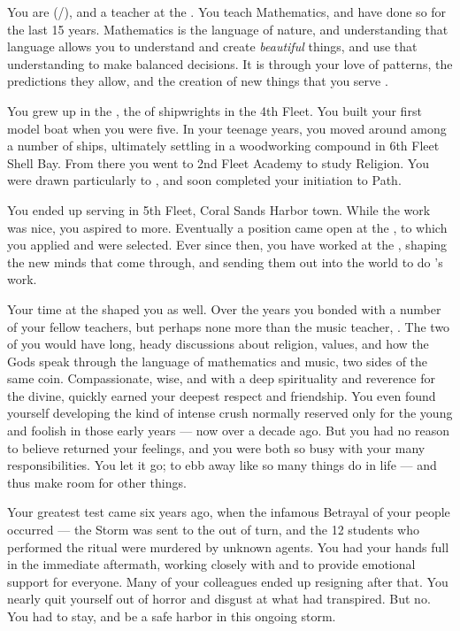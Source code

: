 \documentclass[char]{GL2020}
\begin{document}
\name{\cFlowPriest{}}

You are \cFlowPriest{\full} (\cFlowPriest{\they}/\cFlowPriest{\them}), and a teacher at the \pSchool{}. You teach Mathematics, and have done so for the last 15 years. Mathematics is the language of nature, and understanding that language allows you to understand and create \emph{beautiful} things, and use that understanding to make balanced decisions. It is through your love of patterns, the predictions they allow, and the creation of new things that you serve \cFlow{\full}.

You grew up in the \pShip{}, the \cFlowPriest{\offspring} of shipwrights in the 4th Fleet. You built your first model boat when you were five. In your teenage years, you moved around among a number of ships, ultimately settling in a woodworking compound in 6th Fleet Shell Bay. From there you went to 2nd Fleet Academy to study Religion. You were drawn particularly to \cFlow{}, and soon completed your initiation to \cFlow{\their} Path.

You ended up serving in 5th Fleet, Coral Sands Harbor town. While the work was nice, you aspired to more. Eventually a position came open at the \pSchool{}, to which you applied and were selected. Ever since then, you have worked at the \pSc{}, shaping the new minds that come through, and sending them out into the world to do \cFlow{}'s work.

Your time at the \pSchool{} shaped you as well. Over the years you bonded with a number of your fellow teachers, but perhaps none more than the music teacher, \cMusic{\full}. The two of you would have long, heady discussions about religion, values, and how the Gods speak through the language of mathematics and music, two sides of the same coin. Compassionate, wise, and with a deep spirituality and reverence for the divine, \cMusic{} quickly earned your deepest respect and friendship. You even found yourself developing the kind of intense crush normally reserved only for the young and foolish in those early years — now over a decade ago. But you had no reason to believe \cMusic{} returned your feelings, and you were both so busy with your many responsibilities. You let it go; to ebb away like so many things do in life — and thus make room for other things.

Your greatest test came six years ago, when the infamous Betrayal of your people occurred — the Storm was sent to the \pShip{} out of turn, and the 12 students who performed the ritual were murdered by unknown agents. You had your hands full in the immediate aftermath, working closely with \cEthics{\full} and \cMusic{} to provide emotional support for everyone. Many of your colleagues ended up resigning after that. You nearly quit yourself out of horror and disgust at what had transpired. But no. You had to stay, and be a safe harbor in this ongoing storm. 
\end{document}

